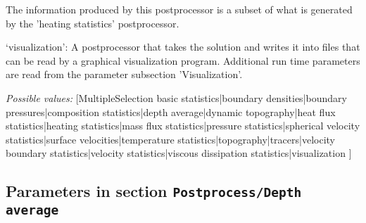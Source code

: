 \begin{itemize}
The information produced by this postprocessor is a subset of what is generated by the 'heating statistics' postprocessor.

`visualization': A postprocessor that takes the solution and writes it into files that can be read by a graphical visualization program. Additional run time parameters are read from the parameter subsection 'Visualization'.


{\it Possible values:} [MultipleSelection basic statistics|boundary densities|boundary pressures|composition statistics|depth average|dynamic topography|heat flux statistics|heating statistics|mass flux statistics|pressure statistics|spherical velocity statistics|surface velocities|temperature statistics|topography|tracers|velocity boundary statistics|velocity statistics|viscous dissipation statistics|visualization ]
\end{itemize}



\subsection{Parameters in section \tt Postprocess/Depth average}
\label{parameters:Postprocess/Depth_20average}


